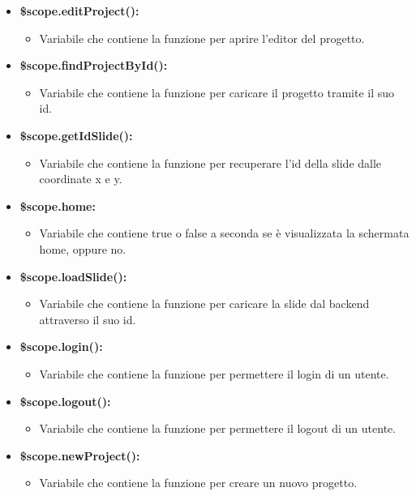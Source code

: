 \begin{itemize}
	\item \textbf{\$scope.editProject():}
	\begin{itemize}
		\item Variabile che contiene la funzione per aprire l'editor del progetto.
	\end{itemize}
	
	\item \textbf{\$scope.findProjectById():}
	\begin{itemize}
		\item Variabile che contiene la funzione per caricare il progetto tramite il suo id.
	\end{itemize}
	
	\item \textbf{\$scope.getIdSlide():}
	\begin{itemize}
		\item Variabile che contiene la funzione per recuperare l'id della slide dalle coordinate x e y.
	\end{itemize}
	
	\item \textbf{\$scope.home:}
	\begin{itemize}
		\item Variabile che contiene true o false a seconda se è visualizzata la schermata home, oppure no.
	\end{itemize}
	
	\item \textbf{\$scope.loadSlide():}
	\begin{itemize}
		\item Variabile che contiene la funzione per caricare la slide dal backend attraverso il suo id.
	\end{itemize}
	
	\item \textbf{\$scope.login():}
	\begin{itemize}
		\item Variabile che contiene la funzione per permettere il login di un utente.
	\end{itemize}
	
	\item \textbf{\$scope.logout():}
	\begin{itemize}
		\item Variabile che contiene la funzione per permettere il logout di un utente.
	\end{itemize}
	
	\item \textbf{\$scope.newProject():}
	\begin{itemize}
		\item Variabile che contiene la funzione per creare un nuovo progetto.
	\end{itemize}


\end{itemize}
